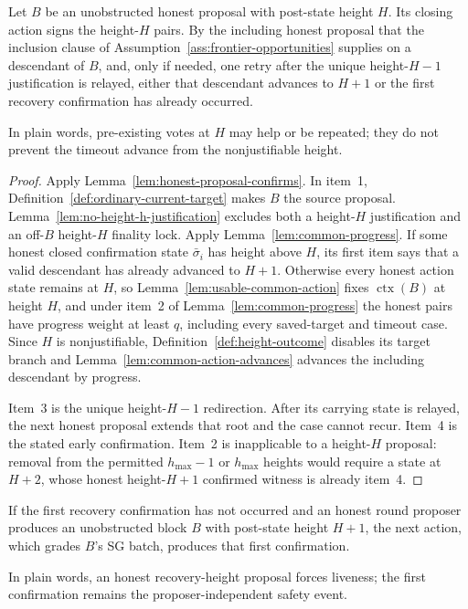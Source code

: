 \begin{lemma}
\label{lem:leave-nonjustifiable-height}
Let \(B\) be an unobstructed honest proposal with post-state height \(H\).
Its closing action signs the height-\(H\) pairs.  By the including
honest proposal that the inclusion clause of
Assumption~\ref{ass:frontier-opportunities} supplies on a descendant of
\(B\), and, only if needed,
one retry after the unique height-\(H-1\) justification is relayed, either
that descendant advances to \(H+1\) or the first recovery confirmation has
already occurred.

In plain words, pre-existing votes at \(H\) may help or be repeated; they do
not prevent the timeout advance from the nonjustifiable height.
\end{lemma}

\begin{proof}
Apply Lemma~\ref{lem:honest-proposal-confirms}.  In item~1,
Definition~\ref{def:ordinary-current-target} makes \(B\) the source proposal.
Lemma~\ref{lem:no-height-h-justification} excludes both a height-\(H\)
justification and an off-\(B\) height-\(H\) finality lock.
Apply Lemma~\ref{lem:common-progress}.  If some honest closed confirmation state \(\bar\sigma_i\) has
height above \(H\), its first item says that a valid
descendant has already advanced to \(H+1\).  Otherwise every honest action
state remains at \(H\), so Lemma~\ref{lem:usable-common-action} fixes
\(\operatorname{ctx}(B)\) at height \(H\), and under item~2 of
Lemma~\ref{lem:common-progress} the
honest pairs have progress weight at least \(q\), including every
saved-target and timeout case.  Since \(H\) is nonjustifiable,
Definition~\ref{def:height-outcome} disables its target branch and
Lemma~\ref{lem:common-action-advances} advances the including descendant by
progress.

Item~3 is the unique height-\(H-1\) redirection.  After its carrying state is
relayed, the next honest proposal extends that root and the case cannot
recur.  Item~4 is the stated early confirmation.  Item~2 is inapplicable to
a height-\(H\) proposal: removal from the permitted \(h_{\max}-1\) or
\(h_{\max}\) heights would require a state
at \(H+2\), whose honest height-\(H+1\) confirmed witness is already item~4.
\end{proof}

\begin{lemma}
\label{lem:honest-proposer-forces-first-confirmation}
If the first recovery confirmation has not occurred and an honest round
proposer produces an unobstructed block \(B\) with post-state height \(H+1\),
the next action, which grades \(B\)'s SG batch, produces that first
confirmation.

In plain words, an honest recovery-height proposal forces liveness; the first
confirmation remains the proposer-independent safety event.
\end{lemma}

